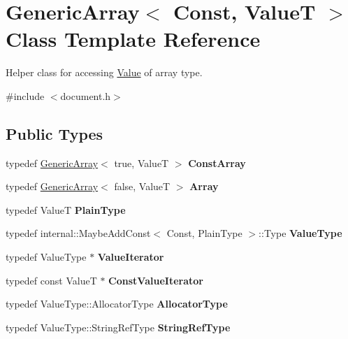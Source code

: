 \hypertarget{classGenericArray}{}\section{Generic\+Array$<$ Const, ValueT $>$ Class Template Reference}
\label{classGenericArray}


Helper class for accessing \hyperlink{classValue}{Value} of array type.  




{\ttfamily \#include $<$document.\+h$>$}

\subsection*{Public Types}
\begin{DoxyCompactItemize}
\item 
\mbox{\label{classGenericArray_a84f0b14518bc5cc44b4ff76a7d5ef81b}} 
typedef \hyperlink{classGenericArray}{Generic\+Array}$<$ true, ValueT $>$ {\bfseries Const\+Array}
\item 
\mbox{\label{classGenericArray_a6683902e86c051c2319e873537dca7b1}} 
typedef \hyperlink{classGenericArray}{Generic\+Array}$<$ false, ValueT $>$ {\bfseries Array}
\item 
\mbox{\label{classGenericArray_aecea8be3dca6799bc523f4bffd221839}} 
typedef ValueT {\bfseries Plain\+Type}
\item 
\mbox{\label{classGenericArray_a93e53f38a99fc5167eb2a28653de64ed}} 
typedef internal\+::\+Maybe\+Add\+Const$<$ Const, Plain\+Type $>$\+::Type {\bfseries Value\+Type}
\item 
\mbox{\label{classGenericArray_afc6ad62c3f00531fa378db266182704a}} 
typedef Value\+Type $\ast$ {\bfseries Value\+Iterator}
\item 
\mbox{\label{classGenericArray_a1cd7bb3e75ccfeed3e8b0a6bb5563d68}} 
typedef const ValueT $\ast$ {\bfseries Const\+Value\+Iterator}
\item 
\mbox{\label{classGenericArray_af9cdc12de03c742b9c33dfc172756b97}} 
typedef Value\+Type\+::\+Allocator\+Type {\bfseries Allocator\+Type}
\item 
\mbox{\label{classGenericArray_a8dcb9e2a2e103ce1051c16a7486465b9}} 
typedef Value\+Type\+::\+String\+Ref\+Type {\bfseries String\+Ref\+Type}
\end{DoxyCompactItemize}
